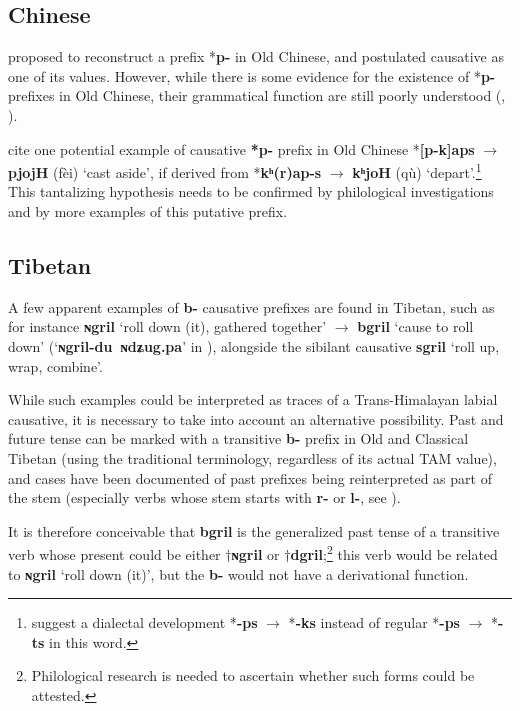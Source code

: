 \documentclass[oneside,a4paper,11pt]{article}
\newcommand{\ipa}[1]{\textbf{{\phon\mbox{#1}}}} %
\newcommand{\zh}[1]{{\cn{#1}}}
\newcommand{\forme}[2]{\ipa{#1} `#2'}
\begin{document}
\subsection{Chinese}
 \citet[593]{maspero52} proposed to reconstruct a prefix *\ipa{p-} in Old Chinese, and postulated causative as one of its values. However,  while there is some evidence for the existence of *\ipa{p-} prefixes in Old Chinese, their grammatical function are still poorly understood (\citealt[87-9]{sagart99roc}, \citealt{behr10ocp}).
 
 \citet[154]{bs14oc} cite one potential example of causative \ipa{*p-} prefix in Old Chinese \zh{廢} *\ipa{[p-k]aps} $\rightarrow$ \ipa{pjojH} (fèi) `cast aside', if derived from 
 \zh{去} *\ipa{kʰ(r)ap-s} $\rightarrow$ \ipa{kʰjoH} (qù) `depart'.\footnote{ \citet[153]{bs14oc} suggest a dialectal development *\ipa{-ps} $\rightarrow$ *\ipa{-ks} instead of regular *\ipa{-ps} $\rightarrow$ *\ipa{-ts} in this word. } This tantalizing hypothesis needs to be confirmed by philological investigations and by more examples of this putative prefix.
  
\subsection{Tibetan}
A few apparent examples of \ipa{b-} causative prefixes are found in Tibetan, such as for instance \forme{ɴgril}{roll down (it), gathered together} $\rightarrow$ \forme{bgril}{cause to roll down} (`\ipa{ɴgril-du ɴdʑug.pa}' in \citealt{bodrgya}), alongside the sibilant causative \forme{sgril}{roll up, wrap, combine}.

While such examples could be interpreted as traces of a Trans-Himalayan labial causative, it is necessary to take into account an alternative possibility. Past and future tense can be marked with a transitive \ipa{b-} prefix in Old and Classical Tibetan (using the traditional terminology, regardless of its actual TAM value), and cases have been documented of past prefixes being reinterpreted as part of the stem (especially verbs whose stem starts with \ipa{r-} or \ipa{l-}, see  \citet{hill05vbri, jacques10ndr, hill15lan}).

It is therefore conceivable that  \ipa{bgril} is the generalized past tense of a transitive verb whose present could be either $\dagger$\ipa{ɴgril} or $\dagger$\ipa{dgril};\footnote{Philological research is needed to ascertain whether such forms could be attested.} this verb would be related to \forme{ɴgril}{roll down (it)}, but the \ipa{b-} would not have a derivational function. 
 
\end{document}
